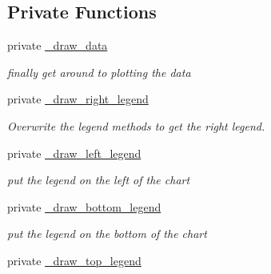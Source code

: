 \subsection*{Private Functions}
\label{_amgrp8d29cff216bafa3117e21883ea7c6b5f}
 \begin{DoxyCompactItemize}
\item 
private \hyperlink{classChart_1_1Pie_a223df30ed6555878015b643547919911}{\_\-draw\_\-data}
\begin{DoxyCompactList}\small\item\em finally get around to plotting the data \item\end{DoxyCompactList}\item 
\hypertarget{classChart_1_1Pie_a382ad440d989138b4407473660cc0049}{
private \hyperlink{classChart_1_1Pie_a382ad440d989138b4407473660cc0049}{\_\-draw\_\-right\_\-legend}}
\label{classChart_1_1Pie_a382ad440d989138b4407473660cc0049}

\begin{DoxyCompactList}\small\item\em Overwrite the legend methods to get the right legend. \item\end{DoxyCompactList}\item 
\hypertarget{classChart_1_1Pie_a2cb3d178f0140da6e9d65bde7bd66563}{
private \hyperlink{classChart_1_1Pie_a2cb3d178f0140da6e9d65bde7bd66563}{\_\-draw\_\-left\_\-legend}}
\label{classChart_1_1Pie_a2cb3d178f0140da6e9d65bde7bd66563}

\begin{DoxyCompactList}\small\item\em put the legend on the left of the chart \item\end{DoxyCompactList}\item 
\hypertarget{classChart_1_1Pie_a4784e7e03796ecef3126fc505fa1e992}{
private \hyperlink{classChart_1_1Pie_a4784e7e03796ecef3126fc505fa1e992}{\_\-draw\_\-bottom\_\-legend}}
\label{classChart_1_1Pie_a4784e7e03796ecef3126fc505fa1e992}

\begin{DoxyCompactList}\small\item\em put the legend on the bottom of the chart \item\end{DoxyCompactList}\item 
\hypertarget{classChart_1_1Pie_acf7d23aa043e7ecc4aa1fcd4c80f9d9e}{
private \hyperlink{classChart_1_1Pie_acf7d23aa043e7ecc4aa1fcd4c80f9d9e}{\_\-draw\_\-top\_\-legend}}
\label{classChart_1_1Pie_acf7d23aa043e7ecc4aa1fcd4c80f9d9e}


\end{DoxyCompactItemize}

